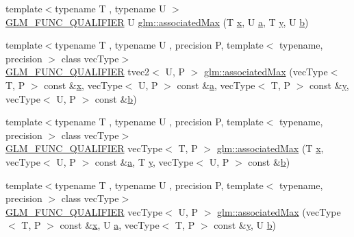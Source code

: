 \begin{DoxyCompactItemize}
\item 
{\footnotesize template$<$typename T , typename U $>$ }\\\mbox{\hyperlink{setup_8hpp_a33fdea6f91c5f834105f7415e2a64407}{G\+L\+M\+\_\+\+F\+U\+N\+C\+\_\+\+Q\+U\+A\+L\+I\+F\+I\+ER}} U \mbox{\hyperlink{group__gtx__associated__min__max_ga7d9c8785230c8db60f72ec8975f1ba45}{glm\+::associated\+Max}} (T \mbox{\hyperlink{glad_8h_a92d0386e5c19fb81ea88c9f99644ab1d}{x}}, U \mbox{\hyperlink{glad_8h_ac8729153468b5dcf13f971b21d84d4e5}{a}}, T \mbox{\hyperlink{glad_8h_a66ddd433d2cacfe27f5906b7e86faeed}{y}}, U \mbox{\hyperlink{glad_8h_a6eba317e3cf44d6d26c04a5a8f197dcb}{b}})
\item 
{\footnotesize template$<$typename T , typename U , precision P, template$<$ typename, precision $>$ class vec\+Type$>$ }\\\mbox{\hyperlink{setup_8hpp_a33fdea6f91c5f834105f7415e2a64407}{G\+L\+M\+\_\+\+F\+U\+N\+C\+\_\+\+Q\+U\+A\+L\+I\+F\+I\+ER}} tvec2$<$ U, P $>$ \mbox{\hyperlink{group__gtx__associated__min__max_ga10ba6001798f42a0f941f19ff30e066a}{glm\+::associated\+Max}} (vec\+Type$<$ T, P $>$ const \&\mbox{\hyperlink{glad_8h_a92d0386e5c19fb81ea88c9f99644ab1d}{x}}, vec\+Type$<$ U, P $>$ const \&\mbox{\hyperlink{glad_8h_ac8729153468b5dcf13f971b21d84d4e5}{a}}, vec\+Type$<$ T, P $>$ const \&\mbox{\hyperlink{glad_8h_a66ddd433d2cacfe27f5906b7e86faeed}{y}}, vec\+Type$<$ U, P $>$ const \&\mbox{\hyperlink{glad_8h_a6eba317e3cf44d6d26c04a5a8f197dcb}{b}})
\item 
{\footnotesize template$<$typename T , typename U , precision P, template$<$ typename, precision $>$ class vec\+Type$>$ }\\\mbox{\hyperlink{setup_8hpp_a33fdea6f91c5f834105f7415e2a64407}{G\+L\+M\+\_\+\+F\+U\+N\+C\+\_\+\+Q\+U\+A\+L\+I\+F\+I\+ER}} vec\+Type$<$ T, P $>$ \mbox{\hyperlink{group__gtx__associated__min__max_ga62ca63cca6b21387b8a25474f441a869}{glm\+::associated\+Max}} (T \mbox{\hyperlink{glad_8h_a92d0386e5c19fb81ea88c9f99644ab1d}{x}}, vec\+Type$<$ U, P $>$ const \&\mbox{\hyperlink{glad_8h_ac8729153468b5dcf13f971b21d84d4e5}{a}}, T \mbox{\hyperlink{glad_8h_a66ddd433d2cacfe27f5906b7e86faeed}{y}}, vec\+Type$<$ U, P $>$ const \&\mbox{\hyperlink{glad_8h_a6eba317e3cf44d6d26c04a5a8f197dcb}{b}})
\item 
{\footnotesize template$<$typename T , typename U , precision P, template$<$ typename, precision $>$ class vec\+Type$>$ }\\\mbox{\hyperlink{setup_8hpp_a33fdea6f91c5f834105f7415e2a64407}{G\+L\+M\+\_\+\+F\+U\+N\+C\+\_\+\+Q\+U\+A\+L\+I\+F\+I\+ER}} vec\+Type$<$ U, P $>$ \mbox{\hyperlink{group__gtx__associated__min__max_ga5364520173815b66a9d9e452c38bf312}{glm\+::associated\+Max}} (vec\+Type$<$ T, P $>$ const \&\mbox{\hyperlink{glad_8h_a92d0386e5c19fb81ea88c9f99644ab1d}{x}}, U \mbox{\hyperlink{glad_8h_ac8729153468b5dcf13f971b21d84d4e5}{a}}, vec\+Type$<$ T, P $>$ const \&\mbox{\hyperlink{glad_8h_a66ddd433d2cacfe27f5906b7e86faeed}{y}}, U \mbox{\hyperlink{glad_8h_a6eba317e3cf44d6d26c04a5a8f197dcb}{b}})

\end{DoxyCompactItemize}
